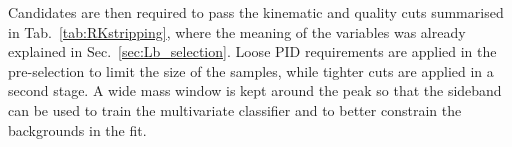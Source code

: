 Candidates are then required to pass the kinematic and quality cuts summarised in Tab.~\ref{tab:RKstripping},
where the meaning of the variables was already explained in Sec.~\ref{sec:Lb_selection}.
Loose PID requirements are applied in the pre-selection to limit the size of the samples, while tighter cuts 
are applied in a second stage. A wide mass window is kept around the \Bz peak so that
 the sideband can be used to train the multivariate classifier and to better constrain the backgrounds in the fit.
%
%
